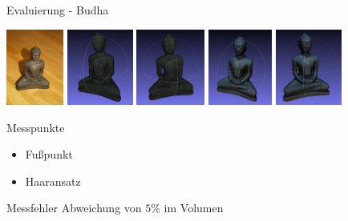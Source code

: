 \documentclass[11pt]{beamer}
\begin{document}
\begin{frame}{Evaluierung - Budha}

	\includegraphics[height=2.5cm]{images/budha/Budha_original.jpg}
	\includegraphics[height=2.5cm]{images/budha/Budha_3DScan_Untextured_2.png}
	\includegraphics[height=2.5cm]{images/budha/Budha_3DScan_Untextured.png}
	\includegraphics[height=2.5cm]{images/budha/Budha_SfM_Textured.png}
	\includegraphics[height=2.5cm]{images/budha/Budha_SfM_Textured_2.png}
	
	\begin{block}{Messpunkte}
		\begin{itemize}
			\item Fußpunkt
			\item Haaransatz
		\end{itemize}
	\end{block}
	\begin{block}{Messfehler}
		Abweichung von $5 \%$ im Volumen
	\end{block}
\end{frame}
\end{document}
